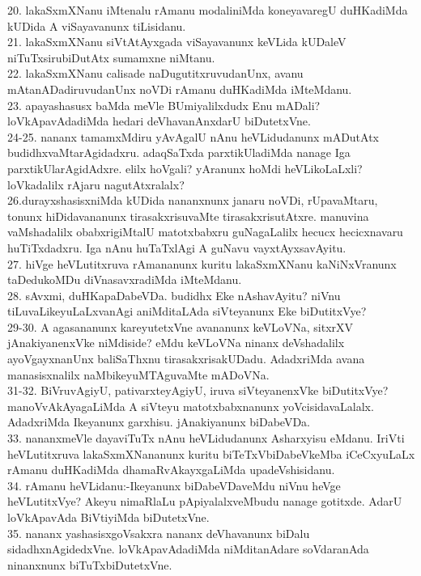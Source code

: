\documentclass{article}
\begin{document}
20. lakaSxmXNanu iMtenalu rAmanu modaliniMda koneyavaregU duHKadiMda kUDida A viSayavanunx tiLisidanu.\\
21. lakaSxmXNanu siVtAtAyxgada viSayavanunx keVLida kUDaleV niTuTxsirubiDutAtx sumamxne niMtanu.\\
22. lakaSxmXNanu calisade naDugutitxruvudanUnx, avanu mAtanADadiruvudanUnx noVDi rAmanu duHKadiMda iMteMdanu.\\
23. apayashasusx baMda meVle BUmiyalilxdudx Enu mADali? loVkApavAdadiMda hedari deVhavanAnxdarU biDutetxVne.\\
24-25. nananx tamamxMdiru yAvAgalU nAnu heVLidudanunx mADutAtx budidhxvaMtarAgidadxru. adaqSaTxda parxtikUladiMda nanage Iga parxtikUlarAgidAdxre. elilx hoVgali? yAranunx hoMdi heVLikoLaLxli? loVkadalilx rAjaru nagutAtxralalx?\\
26.durayxshasisxniMda kUDida nananxnunx janaru noVDi, rUpavaMtaru, tonunx hiDidavananunx tirasakxrisuvaMte tirasakxrisutAtxre. manuvina vaMshadalilx obabxrigiMtalU matotxbabxru guNagaLalilx hecucx hecicxnavaru huTiTxdadxru. Iga nAnu huTaTxlAgi A guNavu vayxtAyxsavAyitu.\\
27. hiVge heVLutitxruva rAmananunx kuritu lakaSxmXNanu kaNiNxVranunx taDedukoMDu diVnasavxradiMda iMteMdanu.\\
28. sAvxmi, duHKapaDabeVDa. budidhx Eke nAshavAyitu? niVnu tiLuvaLikeyuLaLxvanAgi aniMditaLAda siVteyanunx Eke biDutitxVye?\\
29-30. A agasananunx kareyutetxVne avananunx keVLoVNa, sitxrXV jAnakiyanenxVke niMdiside? eMdu keVLoVNa ninanx deVshadalilx ayoVgayxnanUnx baliSaThxnu tirasakxrisakUDadu. AdadxriMda avana manasisxnalilx naMbikeyuMTAguvaMte mADoVNa.\\
31-32. BiVruvAgiyU, pativarxteyAgiyU, iruva siVteyanenxVke biDutitxVye? manoVvAkAyagaLiMda A siVteyu matotxbabxnanunx yoVcisidavaLalalx. AdadxriMda Ikeyanunx garxhisu. jAnakiyanunx biDabeVDa.\\
33. nananxmeVle dayaviTuTx nAnu heVLidudanunx Asharxyisu eMdanu. IriVti heVLutitxruva lakaSxmXNananunx kuritu biTeTxVbiDabeVkeMba iCeCxyuLaLx rAmanu duHKadiMda dhamaRvAkayxgaLiMda upadeVshisidanu.\\
34. rAmanu heVLidanu:-Ikeyanunx biDabeVDaveMdu niVnu heVge heVLutitxVye? Akeyu nimaRlaLu pApiyalalxveMbudu nanage gotitxde. AdarU loVkApavAda BiVtiyiMda biDutetxVne.\\
35. nananx yashasisxgoVsakxra nananx deVhavanunx biDalu sidadhxnAgidedxVne. loVkApavAdadiMda niMditanAdare soVdaranAda ninanxnunx biTuTxbiDutetxVne.\\
\end{document}
